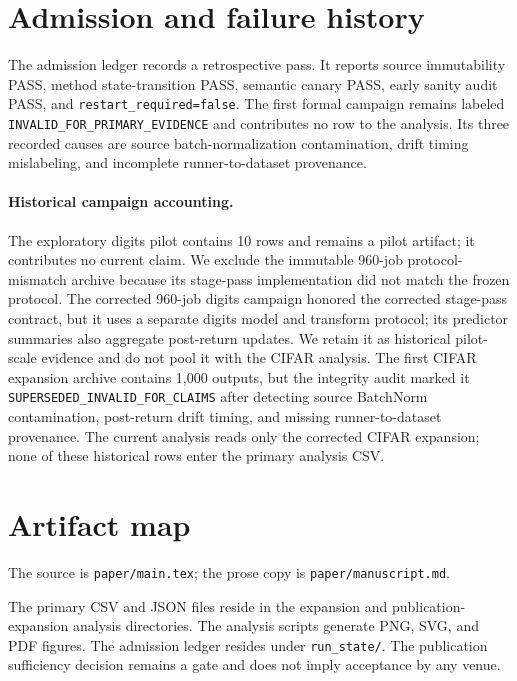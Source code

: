 \documentclass[11pt]{article}
\begin{document}
\section{Admission and failure history}
\label{app:admission}

The admission ledger records a retrospective pass. It reports source immutability PASS, method state-transition PASS, semantic canary PASS, early sanity audit PASS, and \texttt{restart\_required=false}. The first formal campaign remains labeled \texttt{INVALID\_FOR\_PRIMARY\_EVIDENCE} and contributes no row to the analysis. Its three recorded causes are source batch-normalization contamination, drift timing mislabeling, and incomplete runner-to-dataset provenance.

\begingroup\sloppy
\paragraph{Historical campaign accounting.} The exploratory digits pilot contains 10 rows and remains a pilot artifact; it contributes no current claim. We exclude the immutable 960-job protocol-mismatch archive because its stage-pass implementation did not match the frozen protocol. The corrected 960-job digits campaign honored the corrected stage-pass contract, but it uses a separate digits model and transform protocol; its predictor summaries also aggregate post-return updates. We retain it as historical pilot-scale evidence and do not pool it with the CIFAR analysis. The first CIFAR expansion archive contains 1,000 outputs, but the integrity audit marked it \texttt{SUPERSEDED\_INVALID\_FOR\_CLAIMS} after detecting source BatchNorm contamination, post-return drift timing, and missing runner-to-dataset provenance. The current analysis reads only the corrected CIFAR expansion; none of these historical rows enter the primary analysis CSV.
\endgroup

\section{Artifact map}
\label{app:artifacts}
The source is \texttt{paper/main.tex}; the prose copy is \texttt{paper/manuscript.md}.

The primary CSV and JSON files reside in the expansion and publication-expansion analysis directories. The analysis scripts generate PNG, SVG, and PDF figures. The admission ledger resides under \texttt{run\_state/}. The publication sufficiency decision remains a gate and does not imply acceptance by any venue.
\end{document}
